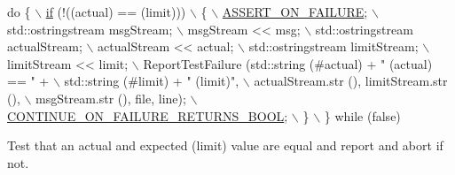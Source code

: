 \begin{DoxyCode}
\textcolor{keywordflow}{do} \{                                                                  \hyperlink{loss__ITU1238_8m_a419d895abe1313c35fa353c93802647e}{\(\backslash\)}
\hyperlink{loss__ITU1238_8m_a419d895abe1313c35fa353c93802647e}{    if} (!((actual) == (limit)))                                         \(\backslash\)
      \{                                                                 \hyperlink{group__testing_ga044d7c8c214fe3761af96ee3cbe2edc3}{\(\backslash\)}
\hyperlink{group__testing_ga044d7c8c214fe3761af96ee3cbe2edc3}{        ASSERT\_ON\_FAILURE};                                              \(\backslash\)
        std::ostringstream msgStream;                                   \(\backslash\)
        msgStream << msg;                                               \(\backslash\)
        std::ostringstream actualStream;                                \(\backslash\)
        actualStream << actual;                                         \(\backslash\)
        std::ostringstream limitStream;                                 \(\backslash\)
        limitStream << limit;                                           \(\backslash\)
        ReportTestFailure (std::string (#actual) + \textcolor{stringliteral}{" (actual) == "} +    \(\backslash\)
                       std::string (#limit) + \textcolor{stringliteral}{" (limit)"},               \(\backslash\)
                       actualStream.str (), limitStream.str (),         \(\backslash\)
                       msgStream.str (), file, line);                   \hyperlink{group__testing_gac69c0f4943a60d1dcecdcd793f905449}{\(\backslash\)}
\hyperlink{group__testing_gac69c0f4943a60d1dcecdcd793f905449}{        CONTINUE\_ON\_FAILURE\_RETURNS\_BOOL};                          
           \(\backslash\)
      \}                                                                 \(\backslash\)
  \} \textcolor{keywordflow}{while} (\textcolor{keyword}{false})
\end{DoxyCode}


Test that an actual and expected (limit) value are equal and report and abort if not. 

